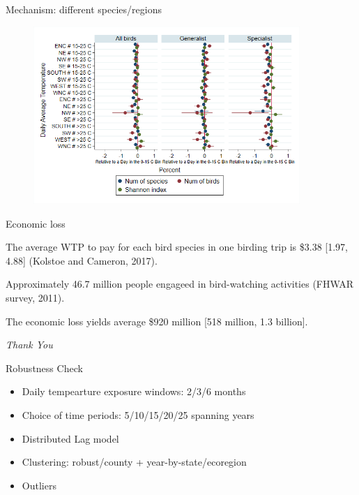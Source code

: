 \documentclass[handout]{beamer}
\begin{document}
\begin{frame}{Mechanism: different species/regions}
  \begin{figure}[h]
  \centering
  \includegraphics[width=0.9\textwidth]{bird_figure3.png}
  \end{figure}
\end{frame}

\begin{frame}{Economic loss}
  \item The average WTP to pay for each bird species in one birding trip is \$3.38 [1.97, 4.88] (Kolstoe and Cameron, 2017).
  \item Approximately 46.7 million people engageed in bird-watching activities (FHWAR survey, 2011).
  \item The economic loss yields average \$920 million [518 million, 1.3 billion].
\end{frame}

\begin{frame}{}
  \centering \Huge
  \emph{Thank You}
\end{frame}


\begin{frame}{Robustness Check}
 \begin{itemize}
   \item Daily tempearture exposure windows: 2/3/6 months
   \item Choice of time periods: 5/10/15/20/25 spanning years
   \item Distributed Lag model
   \item Clustering: robust/county + year-by-state/ecoregion
   \item Outliers
 \end{itemize}
\end{frame}
\end{document}
